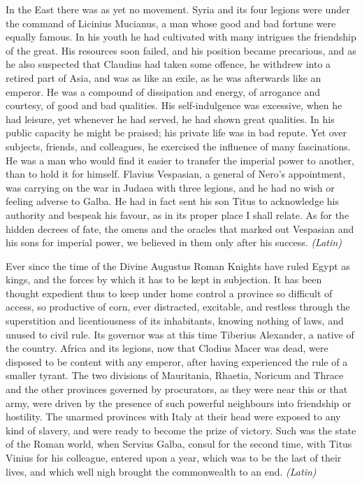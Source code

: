 
In the East there was as yet no movement. Syria and its four legions were under the command of Licinius Mucianus, a man whose good and bad fortune were equally famous. In his youth he had cultivated with many intrigues the friendship of the great. His resources soon failed, and his position became precarious, and as he also suspected that Claudius had taken some offence, he withdrew into a retired part of Asia, and was as like an exile, as he was afterwards like an emperor. He was a compound of dissipation and energy, of arrogance and courtesy, of good and bad qualities. His self-indulgence was excessive, when he had leisure, yet whenever he had served, he had shown great qualities. In his public capacity he might be praised; his private life was in bad repute. Yet over subjects, friends, and colleagues, he exercised the influence of many fascinations. He was a man who would find it easier to transfer the imperial power to another, than to hold it for himself. Flavius Vespasian, a general of Nero's appointment, was carrying on the war in Judaea with three legions, and he had no wish or feeling adverse to Galba. He had in fact sent his son Titus to acknowledge his authority and bespeak his favour, as in its proper place I shall relate. As for the hidden decrees of fate, the omens and the oracles that marked out Vespasian and his sons for imperial power, we believed in them only after his success. \emph{(Latin)}


Ever since the time of the Divine Augustus Roman Knights have ruled Egypt as kings, and the forces by which it has to be kept in subjection. It has been thought expedient thus to keep under home control a province so difficult of access, so productive of corn, ever distracted, excitable, and restless through the superstition and licentiousness of its inhabitants, knowing nothing of laws, and unused to civil rule. Its governor was at this time Tiberius Alexander, a native of the country. Africa and its legions, now that Clodius Macer was dead, were disposed to be content with any emperor, after having experienced the rule of a smaller tyrant. The two divisions of Mauritania, Rhaetia, Noricum and Thrace and the other provinces governed by procurators, as they were near this or that army, were driven by the presence of such powerful neighbours into friendship or hostility. The unarmed provinces with Italy at their head were exposed to any kind of slavery, and were ready to become the prize of victory. Such was the state of the Roman world, when Servius Galba, consul for the second time, with Titus Vinius for his colleague, entered upon a year, which was to be the last of their lives, and which well nigh brought the commonwealth to an end. \emph{(Latin)}


